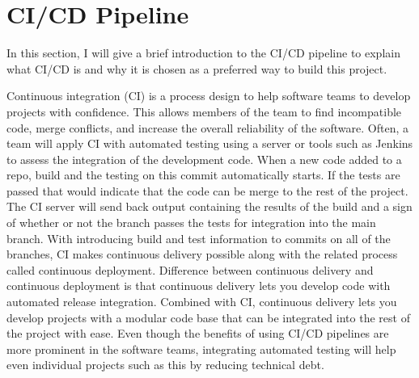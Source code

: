 \section{CI/CD Pipeline} \label{sec:cicd}
In this section, I will give a brief introduction to the CI/CD pipeline to explain what CI/CD is and why it is chosen as a preferred way to build this project.

Continuous integration (CI) is a process design to help software teams to develop projects with confidence.
This allows members of the team to find incompatible code, merge conflicts, and increase the overall reliability of the software. 
Often, a team will apply CI with automated testing using a server or tools such as Jenkins to assess the integration of the development code. 
When a new code added to a repo, build and the testing on this commit automatically starts.
If the tests are passed that would indicate that the code can be merge to the rest of the project.
The CI server will send back output containing the results of the build and a sign of whether or not the branch passes the tests for integration into the main branch. 
With introducing build and test information to commits on all of the branches, CI makes continuous delivery possible along with the related process called continuous deployment. 
Difference between continuous delivery and continuous deployment is that continuous delivery lets you develop code with automated release integration.
Combined with CI, continuous delivery lets you develop projects with a modular code base that can be integrated into the rest of the project with ease.
Even though the benefits of using CI/CD pipelines are more prominent in the software teams, integrating automated testing will help even individual projects such as this by reducing technical debt.

